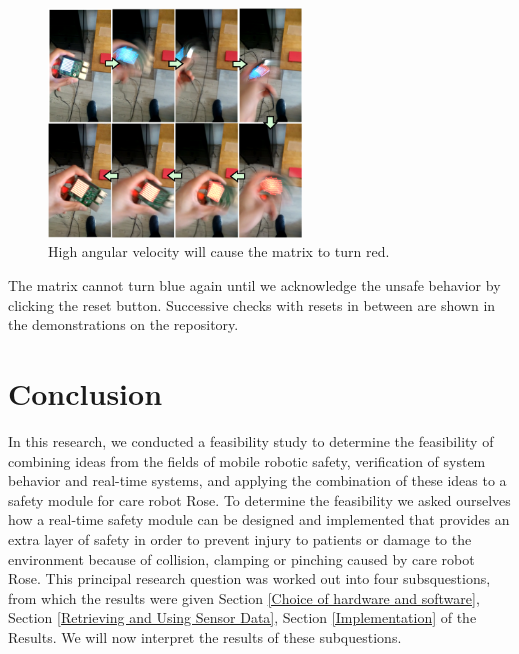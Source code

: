 \documentclass[12pt]{scrreprt}
\begin{document}
\begin{figure}[H]
    \centering
    \includegraphics[width=0.6\textwidth]{Figures/results/lighting_leds/angular_velocity.png}
    \caption{High angular velocity will cause the matrix to turn red.}
    \label{fig:high_angular_velocity}
\end{figure}

The matrix cannot turn blue again until we acknowledge the unsafe behavior by clicking the reset button. Successive checks with resets in between are shown in the demonstrations on the repository.

\newpage
\chapter{Conclusion}
\label{Conclusion}

In this research, we conducted a feasibility study to determine the feasibility of combining ideas from the fields of mobile robotic safety, verification of system behavior and real-time systems, and applying the combination of these ideas to a safety module for care robot Rose. To determine the feasibility we asked ourselves how a real-time safety module can be designed and implemented that provides an extra layer of safety in order to prevent injury to patients or damage to the environment because of collision, clamping or pinching caused by care robot Rose. This principal research question was worked out into four subsquestions, from which the results were given Section \ref{Choice of hardware and software}, Section \ref{Retrieving and Using Sensor Data}, Section \ref{Implementation} of the Results. We will now interpret the results of these subquestions.
\end{document}
